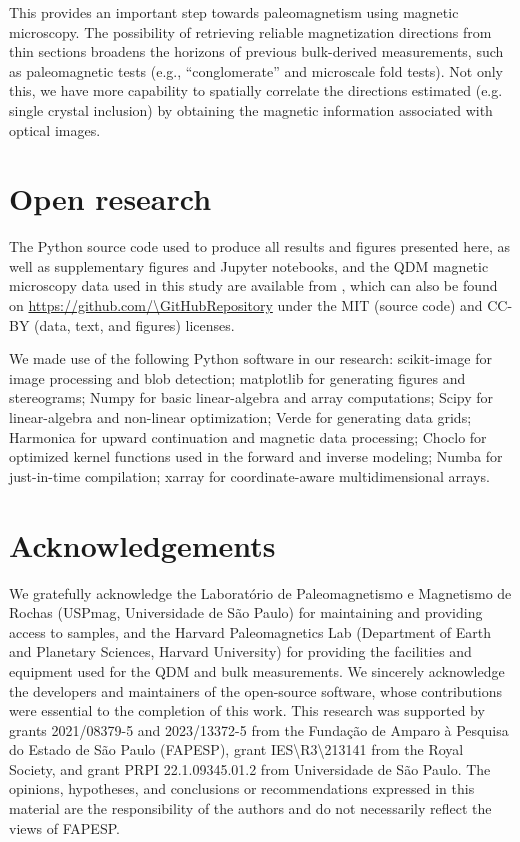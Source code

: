 This provides an important step towards paleomagnetism using magnetic microscopy. The possibility of retrieving reliable magnetization directions from thin sections broadens the horizons of previous bulk-derived measurements, such as paleomagnetic tests (e.g., ``conglomerate'' and microscale fold tests). Not only this, we have more capability to spatially correlate the directions estimated (e.g. single crystal inclusion) by obtaining the magnetic information associated with optical images.


\section{Open research}

The Python source code used to produce all results and figures presented here,
as well as supplementary figures and Jupyter notebooks, and the QDM magnetic
microscopy data used in this study are available from \citet{figshare}, which
can also be found on \url{https://github.com/\GitHubRepository} under the MIT
(source code) and CC-BY (data, text, and figures) licenses.

We made use of the following Python software in our research:
scikit-image \citep{VanderWalt2014} for image processing and blob detection;
matplotlib \citep{Hunter2007} for generating figures and stereograms;
Numpy \citep{Harris2020} for basic linear-algebra and array computations;
Scipy \citep{2020SciPy-NMeth} for linear-algebra and non-linear optimization;
Verde \citep{verde2018} for generating data grids;
Harmonica \citep{harmonica2020} for upward continuation and magnetic data processing;
Choclo \citep{choclo2022} for optimized kernel functions used in the
forward and inverse modeling;
Numba \citep{lam2015numba} for just-in-time compilation;
xarray \citep{hoyer2017xarray} for coordinate-aware multidimensional arrays.

\section{Acknowledgements}

We gratefully acknowledge the Laboratório de Paleomagnetismo e Magnetismo de Rochas (USPmag, Universidade de São Paulo) for maintaining and providing access to samples, and the Harvard Paleomagnetics Lab (Department of Earth and Planetary Sciences, Harvard University) for providing the facilities and equipment used for the QDM and bulk measurements. We sincerely acknowledge the developers and maintainers of the open-source software, whose contributions were essential to the completion of this work. This research was supported by grants 2021/08379-5 and 2023/13372-5 from the Fundação de Amparo à Pesquisa do Estado de São Paulo (FAPESP), grant IES\textbackslash{}R3\textbackslash{}213141 from the Royal Society, and grant PRPI 22.1.09345.01.2 from Universidade de São Paulo.
The opinions, hypotheses, and conclusions or recommendations expressed in this material are the responsibility of the authors and do not necessarily reflect the views of FAPESP.


